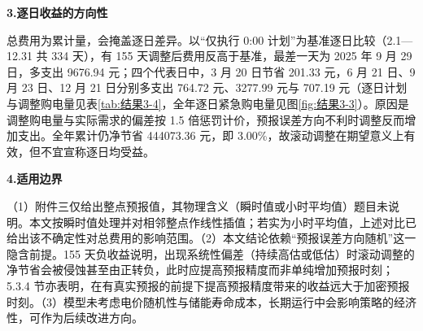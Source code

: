 \textbf{3.逐日收益的方向性}

总费用为累计量，会掩盖逐日差异。以“仅执行 0:00 计划”为基准逐日比较（2.1—12.31 共 334 天），有 155 天调整后费用反高于基准，最差一天为 2025 年 9 月 29 日，多支出 9676.94 元；四个代表日中，3 月 20 日节省 201.33 元，6 月 21 日、9 月 23 日、12 月 21 日分别多支出 764.72 元、3277.99 元与 707.19 元（逐日计划与调整购电量见表\ref{tab:结果3-4}，全年逐日紧急购电量见图\ref{fig:结果3-3}）。原因是调整购电量与实际需求的偏差按 1.5 倍惩罚计价，预报误差方向不利时调整反而增加支出。全年累计仍净节省 444073.36 元，即 3.00\%，故滚动调整在期望意义上有效，但不宜宣称逐日均受益。

\textbf{4.适用边界}

（1）附件三仅给出整点预报值，其物理含义（瞬时值或小时平均值）题目未说明。本文按瞬时值处理并对相邻整点作线性插值；若实为小时平均值，上述对比已给出该不确定性对总费用的影响范围。（2）本文结论依赖“预报误差方向随机”这一隐含前提。155 天负收益说明，出现系统性偏差（持续高估或低估）时滚动调整的净节省会被侵蚀甚至由正转负，此时应提高预报精度而非单纯增加预报时刻；5.3.4 节亦表明，在有真实预报的前提下提高预报精度带来的收益远大于加密预报时刻。（3）模型未考虑电价随机性与储能寿命成本，长期运行中会影响策略的经济性，可作为后续改进方向。
